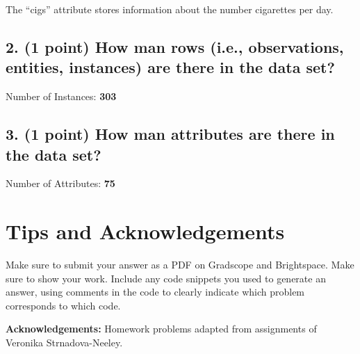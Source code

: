 \documentclass[11pt]{article}
\begin{document}
\begin{tcolorbox}[title=Problem 4.1]
    The ``cigs'' attribute stores information about the number cigarettes per day.
\end{tcolorbox}

\subsection*{\textbf{2. (1 point)} How man rows (i.e., observations, entities, instances) are there in the data set?}

\begin{tcolorbox}[title=Problem 4.2]
    Number of Instances: \textbf{303} 
\end{tcolorbox}

\subsection*{\textbf{3. (1 point)} How man attributes are there in the data set?}

\begin{tcolorbox}[title=Problem 4.3]
    Number of Attributes: \textbf{75} 
\end{tcolorbox}

\newpage
\section*{Tips and Acknowledgements}

Make sure to submit your answer as a PDF on Gradscope and Brightspace. Make sure
to show your work. Include any code snippets you used to generate an answer,
using comments in the code to clearly indicate which problem corresponds to
which code.


{\bf Acknowledgements:} Homework problems adapted from assignments of
Veronika Strnadova-Neeley.
\end{document}
